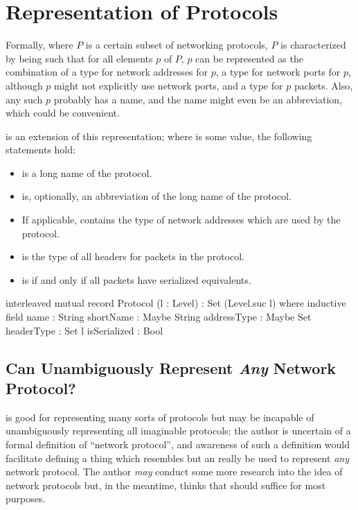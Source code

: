\documentclass{report}
\begin{document}
\chapter{Representation of Protocols}
Formally, where \(P\) is a certain subset of networking protocols, \(P\) is characterized by being such that for all elements \(p\) of \(P\), \(p\) can be represented as the combination of a type for network addresses for \(p\), a type for network ports for \(p\), although \(p\) might not explicitly use network ports, and a type for \(p\) packets.  Also, any such \(p\) probably has a name, and the name might even be an abbreviation, which could be convenient.

 is an extension of this representation; where  is some   value, the following statements hold:
\begin{itemize}
  \item {}  is a long name of the  protocol.
  \item {}  is, optionally, an abbreviation of the long name of the  protocol.
  \item If applicable,   contains the type of network addresses which are used by the  protocol.
  \item {}  is the type of all headers for packets in the  protocol.
  \item {}  is  if and only if all  packets have serialized equivalents.
\end{itemize}

\begin{code}
  interleaved mutual
    record Protocol (l : Level) : Set (Level.suc l) where
      inductive
      field
        name : String
        shortName : Maybe String
        addressType : Maybe Set
        headerType : Set l
        isSerialized : Bool
\end{code}

\section{Can  Unambiguously Represent \emph{Any} Network Protocol?}
 is good for representing many sorts of protocols but may be incapable of unambiguously representing all imaginable protocols; the author is uncertain of a formal definition of ``network protocol'', and awareness of such a definition would facilitate defining a thing which resembles  but an really be used to represent \emph{any} network protocol.  The author \emph{may} conduct some more research into the idea of network protocols but, in the meantime, thinks that  should suffice for most purposes.
\end{document}
